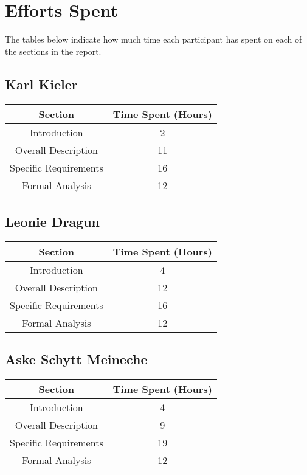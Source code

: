 \clearpage
\newpage
\section{Efforts Spent}
\label{sec:effort}
The tables below indicate how much time each participant has spent on each of the sections in the report. 

\subsection{Karl Kieler}
\begin{table}[h]
\centering
\begin{tabular}{|c|c|}
\hline
Section & Time Spent (Hours) \\ \hline
Introduction & 2 \\ \hline
Overall Description & 11 \\ \hline
Specific Requirements & 16 \\ \hline
Formal Analysis & 12 \\ \hline
\end{tabular}
\end{table}


\subsection{Leonie Dragun}
\begin{table}[h]
\centering
\begin{tabular}{|c|c|}
\hline
Section & Time Spent (Hours) \\ \hline
Introduction & 4 \\ \hline
Overall Description & 12 \\ \hline
Specific Requirements & 16 \\ \hline
Formal Analysis & 12\\ \hline
\end{tabular}
\end{table}


\subsection{Aske Schytt Meineche}
\begin{table}[h]
\centering
\begin{tabular}{|c|c|}
\hline
Section & Time Spent (Hours) \\ \hline
Introduction & 4 \\ \hline
Overall Description & 9 \\ \hline
Specific Requirements & 19 \\ \hline
Formal Analysis & 12 \\ \hline
\end{tabular}
\end{table}

\newpage